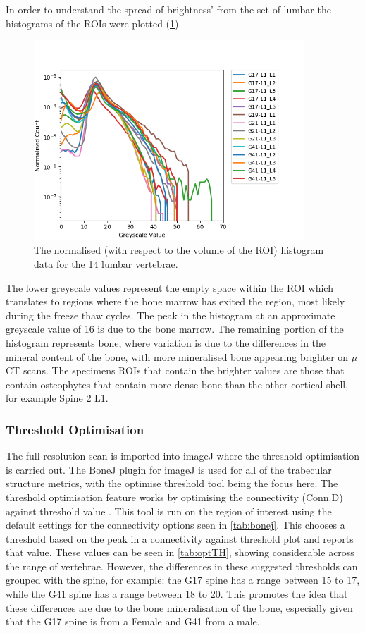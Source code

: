 In order to understand the spread of brightness' from the set of lumbar the
histograms of the ROIs were plotted (\cref{fig:normalisedhistogram}).

\begin{figure}[ht!]
  \centering
 
\includegraphics[width=4in]{Chapters/Chapter_HT_images/Normalised_Histogram.png}
  \caption{The normalised (with respect to the volume of the ROI) histogram
data
    for the 14 lumbar vertebrae.}
  \label{fig:normalisedhistogram}
\end{figure}

The lower greyscale values represent the empty space within the ROI which
translates to regions where the bone marrow has exited the region, most likely
during the freeze thaw cycles. The peak in the histogram at an approximate
greyscale value of 16 is due to the bone marrow. The remaining portion of the
histogram represents bone, where variation is due to the differences in the
mineral content of the bone, with more mineralised bone appearing brighter on
$\mu$CT scans. The specimens ROIs that contain the brighter values are those
that contain osteophytes that contain more dense bone than the other cortical
shell, for example Spine 2 L1.

\subsubsection{Threshold Optimisation}\label{th_opt}


The full resolution scan is imported into imageJ where the threshold
optimisation is carried out.
The BoneJ plugin for imageJ is used for all of the trabecular structure
metrics, with the optimise threshold tool being the focus here.
The threshold optimisation feature works by optimising the connectivity
(Conn.D) against threshold value \autocite{Doubea2010}.
This tool is run on the region of interest using the default settings for the
connectivity options seen in \cref{tab:bonej}.
This chooses a threshold based on the peak in a connectivity against threshold
plot and reports that value.
These values can be seen in \cref{tab:optTH}, showing considerable across the
range of vertebrae.
However, the differences in these suggested thresholds can grouped with the
spine, for example: the G17 spine has a range between 15 to 17, while the G41
spine has a range between 18 to 20.
This promotes the idea that these differences are due to the bone
mineralisation of the bone, especially given that the G17 spine is from a
Female and G41 from a male.

